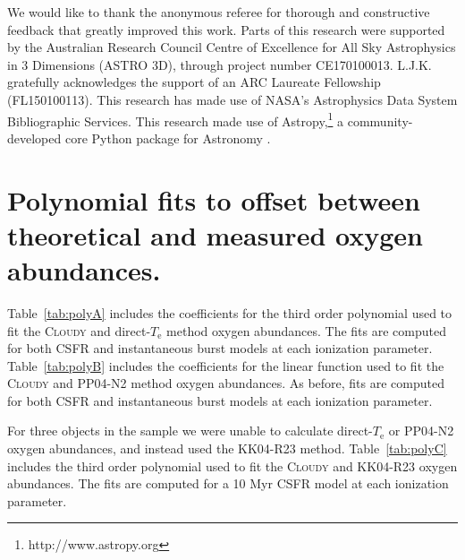 \documentclass[preprint2]{aastex62}
\newcommand{\Cloudy}{\textsc{Cloudy}\xspace}
\newcommand{\Te}{\ensuremath{T_{\mathrm{e}}}\xspace}
\begin{document}
\acknowledgments

We would like to thank the anonymous referee for thorough and constructive feedback that greatly improved this work. Parts of this research were supported by the Australian Research Council Centre of Excellence for All Sky Astrophysics in 3 Dimensions (ASTRO 3D), through project number CE170100013. L.J.K. gratefully acknowledges the support of an ARC Laureate Fellowship (FL150100113). This research has made use of NASA's Astrophysics Data System Bibliographic Services. This research made use of Astropy,\footnote{http://www.astropy.org} a community-developed core Python package for Astronomy \citep{astropy:2013, astropy:2018}.



\appendix

\section{Polynomial fits to offset between theoretical and measured oxygen abundances.}\label{sec:appdx:poly}

Table~\ref{tab:polyA} includes the coefficients for the third order polynomial used to fit the \Cloudy and direct-\Te method oxygen abundances. The fits are computed for both CSFR and instantaneous burst models at each ionization parameter. Table~\ref{tab:polyB} includes the coefficients for the linear function used to fit the \Cloudy and PP04-N2 method oxygen abundances. As before, fits are computed for both CSFR and instantaneous burst models at each ionization parameter.

For three objects in the sample we were unable to calculate direct-\Te or PP04-N2 oxygen abundances, and instead used the KK04-R23 method. Table~\ref{tab:polyC} includes the third order polynomial used to fit the \Cloudy and KK04-R23 oxygen abundances. The fits are computed for a 10 Myr CSFR model at each ionization parameter.
\end{document}
